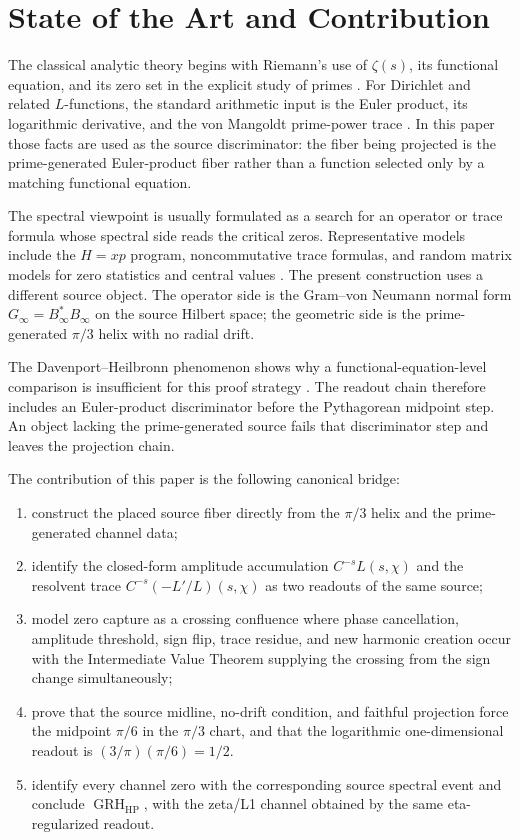 \documentclass[11pt]{article}
\DeclareMathOperator{\GRH}{GRH}
\begin{document}
\section{State of the Art and Contribution}

The classical analytic theory begins with Riemann's use of $\zeta(s)$, its
functional equation, and its zero set in the explicit study of primes
\cite{Riemann1859,Edwards1974,Titchmarsh1986}.  For Dirichlet and related
$L$-functions, the standard arithmetic input is the Euler product, its
logarithmic derivative, and the von Mangoldt prime-power trace
\cite{Davenport2000,MontgomeryVaughan2007,IwaniecKowalski2004}.  In this
paper those facts are used as the source discriminator: the fiber being
projected is the prime-generated Euler-product fiber rather than a function
selected only by a matching functional equation.

The spectral viewpoint is usually formulated as a search for an operator or
trace formula whose spectral side reads the critical zeros.  Representative
models include the $H=xp$ program, noncommutative trace formulas, and random
matrix models for zero statistics and central values
\cite{BerryKeating1999,Connes1999,KeatingSnaith2000}.  The present construction
uses a different source object.  The operator side is the Gram--von Neumann
normal form $G_\infty=B_\infty^*B_\infty$ on the source Hilbert space; the
geometric side is the prime-generated $\pi/3$ helix with no radial drift.

The Davenport--Heilbronn phenomenon shows why a functional-equation-level
comparison is insufficient for this proof strategy \cite{DavenportHeilbronn1936}.
The readout chain therefore includes an Euler-product discriminator before the
Pythagorean midpoint step.  An object lacking the prime-generated source fails
that discriminator step and leaves the projection chain.

The contribution of this paper is the following canonical bridge:
\begin{enumerate}[label=(C\arabic*)]
\item construct the placed source fiber directly from the $\pi/3$ helix and
the prime-generated channel data;
\item identify the closed-form amplitude accumulation $C^{-s}L(s,\chi)$ and
the resolvent trace $C^{-s}(-L'/L)(s,\chi)$ as two readouts of the same source;
\item model zero capture as a crossing confluence where phase cancellation,
amplitude threshold, sign flip, trace residue, and new harmonic creation occur
with the Intermediate Value Theorem supplying the crossing from the sign change
simultaneously;
\item prove that the source midline, no-drift condition, and faithful projection
force the midpoint $\pi/6$ in the
$\pi/3$ chart, and that the logarithmic one-dimensional readout is
$(3/\pi)(\pi/6)=1/2$.
\item identify every channel zero with the corresponding source spectral event
and conclude $\GRH_{\mathrm{HP}}$, with the zeta/L1 channel obtained by the
same eta-regularized readout.
\end{enumerate}
\end{document}
